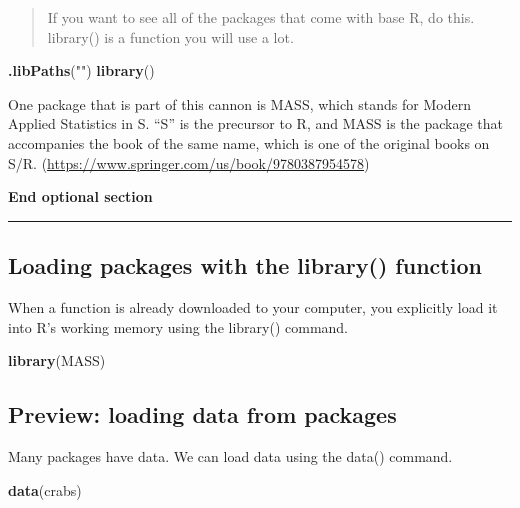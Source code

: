 \documentclass[]{book}
\newenvironment{Shaded}{\begin{snugshade}}{\end{snugshade}}
\newcommand{\KeywordTok}[1]{\textcolor[rgb]{0.13,0.29,0.53}{\textbf{#1}}}
\newcommand{\StringTok}[1]{\textcolor[rgb]{0.31,0.60,0.02}{#1}}
\newcommand{\NormalTok}[1]{#1}
\theoremstyle{definition}
\theoremstyle{definition}
\theoremstyle{definition}
\theoremstyle{remark}
\begin{document}
\begin{quote}
If you want to see all of the packages that come with base R, do this.
library() is a function you will use a lot.
\end{quote}

\begin{Shaded}
\begin{Highlighting}[]
\KeywordTok{.libPaths}\NormalTok{(}\StringTok{""}\NormalTok{) }
\KeywordTok{library}\NormalTok{()}
\end{Highlighting}
\end{Shaded}

One package that is part of this cannon is MASS, which stands for Modern
Applied Statistics in S. ``S'' is the precursor to R, and MASS is the
package that accompanies the book of the same name, which is one of the
original books on S/R.
(\url{https://www.springer.com/us/book/9780387954578})

\textbf{End optional section}

\begin{center}\rule{0.5\linewidth}{\linethickness}\end{center}

\subsection{\texorpdfstring{\protect\hyperlink{section-3}{} Loading
packages with the library()
function}{ Loading packages with the library() function}}\label{loading-packages-with-the-library-function}

When a function is already downloaded to your computer, you explicitly
load it into R's working memory using the library() command.

\begin{Shaded}
\begin{Highlighting}[]
\KeywordTok{library}\NormalTok{(MASS)}
\end{Highlighting}
\end{Shaded}

\subsection{Preview: loading data from
packages}\label{preview-loading-data-from-packages}

Many packages have data. We can load data using the data() command.

\begin{Shaded}
\begin{Highlighting}[]
\KeywordTok{data}\NormalTok{(crabs)}
\end{Highlighting}
\end{Shaded}
\end{document}
